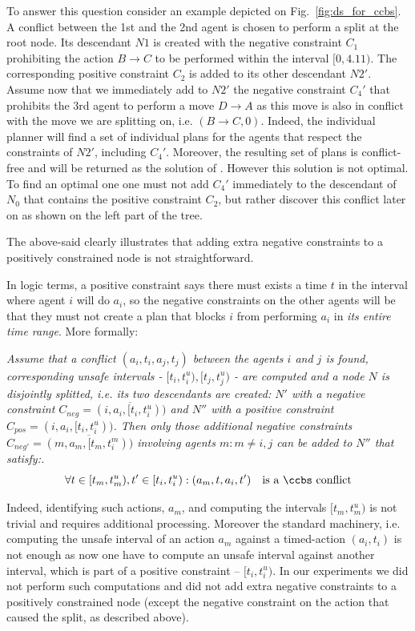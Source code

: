 To answer this question consider an example depicted on Fig.~\ref{fig:ds_for_ccbs}. A conflict between the 1st and the 2nd agent is chosen to perform a split at the root \ct node. Its descendant $N1$ is created with the negative constraint $C_1$ prohibiting the action $B \rightarrow C$ to be performed within the interval $[0, 4.11)$. The corresponding positive constraint $C_2$ is added to its other descendant $N2'$. Assume now that we immediately add to $N2'$ the negative constraint $C_4'$ that prohibits the 3rd agent to perform a move $D \rightarrow A$ as this move is also in conflict with the move we are splitting on, i.e. $(B \rightarrow C, 0)$. Indeed, the individual planner will find a set of individual plans for the agents that respect the constraints of $N2'$, including $C_4'$. Moreover, the resulting set of plans is conflict-free and will be returned as the solution of \mapfr. However this solution is not optimal. To find an optimal one one must not add $C_4'$ immediately to the descendant of $N_0$ that contains the positive constraint $C_2$, but rather discover this conflict later on as shown on the left part of the \ct tree.

The above-said clearly illustrates that adding extra negative constraints to a positively constrained \ct node is not straightforward.

In logic terms, a positive \ccbs constraint says there must exists a time $t$ in the interval where agent $i$ will do $a_i$, so the negative constraints on the other agents will be that they must not create a plan that blocks $i$ from performing $a_i$ in \emph{its entire time range}. More formally:

\textit{Assume that a conflict $(a_i, t_i, a_j, t_j)$ between the agents $i$ and $j$ is found, corresponding unsafe intervals - $[t_i, t_i^u), [t_j, t_j^u)$ - are computed and a \ct node $N$ is disjointly splitted, i.e. its two descendants are created: $N'$ with a negative constraint $C_{neg}=\overline{(i, a_i, [t_i, t_i^u))}$ and $N''$ with a positive constraint $C_{pos}=(i, a_i, [t_i, t_i^u))$. Then only those additional negative constraints $C_{neg'}=\overline{(m, a_m, [t_m, t_i^m))}$ involving agents $m: m \neq i, j$ can be added to $N''$ that satisfy:.
\[
\forall t\in [t_m, t_m^u), t'\in [t_i, t_i^u): (a_m, t, a_i, t') ~~~ \text{is a \ccbs conflict}
\]
}

Indeed, identifying such actions, $a_m$, and computing the intervals $[t_m, t_m^u)$ is not trivial and requires additional processing. Moreover the standard \ccbs machinery, i.e. computing the unsafe interval of an action $a_m$ against a timed-action $(a_i, t_i)$ is not enough as now one have to compute an unsafe interval against another interval, which is part of a positive constraint -- $[t_i, t_i^u)$. In our experiments we did not perform such computations and did not add extra negative constraints to a positively constrained node (except the negative constraint on the action that caused the split, as described above).

